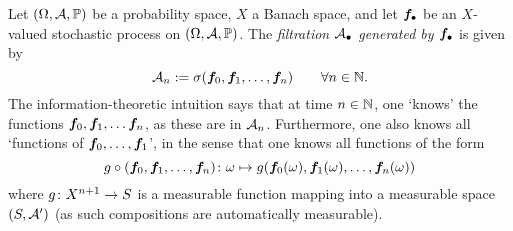 \begin{example}\label{eg:filtration-generated-by-process}
  Let $(\Omega,\mathcal{A},\mathbb{P})$ be a probability space, $X$ a Banach space, and let $\bm{f}_{\bullet}$ be an $X$-valued stochastic process on $(\Omega,\mathcal{A},\mathbb{P})$.
  The \emph{filtration $\mathcal{A}_{\bullet}$ generated by $\bm{f}_{\bullet}$} is given by
  \begin{equation*}
    \mathcal{A}_{n} := \sigma(\bm{f}_0,\bm{f}_1,\ldots,\bm{f}_n) \qquad \forall n \in \mathbb{N}.
  \end{equation*}
  The information-theoretic intuition says that at time $n \in \mathbb{N}$, one `knows' the functions $\bm{f}_0, \bm{f}_1, \ldots \bm{f}_n$, as these are in $\mathcal{A}_n$.
  Furthermore, one also knows all `functions of $\bm{f}_{0}, \ldots, \bm{f}_{1}$', in the sense that one knows all functions of the form
  \begin{equation*}
    g \circ (\bm{f}_0, \bm{f}_1, \ldots, \bm{f}_n) \colon \omega \mapsto g(\bm{f}_0(\omega),\bm{f}_1(\omega),\ldots,\bm{f}_n(\omega))
  \end{equation*}
  where $g \colon X^{n+1} \rightarrow S$ is a measurable function mapping into a measurable space $(S, \mathcal{A}')$ (as such compositions are automatically measurable).
\end{example}

